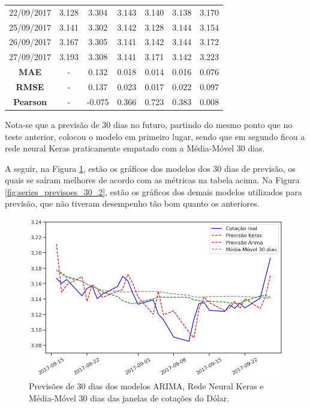 \begin{longtable}{|c|c|c|c|c|c|c|}
22/09/2017 & 3.128 & 3.304 & 3.143 & 3.140 & 3.138 & 3.170 \\
25/09/2017 & 3.141 & 3.302 & 3.142 & 3.128 & 3.144 & 3.154 \\
26/09/2017 & 3.167 & 3.305 & 3.141 & 3.142 & 3.144 & 3.172 \\
27/09/2017 & 3.193 & 3.308 & 3.141 & 3.171 & 3.142 & 3.223 \\
\hline
\hline
\textbf{MAE} & - & 0.132 & 0.018 & 0.014 & 0.016 & 0.076 \\
\textbf{RMSE} & - & 0.137 & 0.023 & 0.017 & 0.022 & 0.097 \\
\textbf{Pearson} & - & -0.075 & 0.366 & 0.723 & 0.383 & 0.008 \\

\end{longtable}
\normalsize

Nota-se que a previsão de $30$ dias no futuro, partindo do mesmo ponto que no teste anterior, colocou o modelo  em primeiro lugar, sendo que em segundo ficou a rede neural Keras praticamente empatado com a Média-Móvel $30$ dias.


A seguir, na Figura \ref{fig:series_previsoes_30_1}, estão os gráficos dos modelos dos $30$ dias de previsão, os quais se saíram melhores de acordo com as métricas na tabela acima. Na Figura \ref{fig:series_previsoes_30_2}, estão os gráficos dos demais modelos utilizados para previsão, que não tiveram desempenho tão bom quanto os anteriores.

\begin{figure}[htb]
\centering
\includegraphics[width=14cm]{figuras/series_previsoes_30_1}
\caption{Previsões de $30$ dias dos modelos ARIMA, Rede Neural Keras e Média-Móvel $30$ dias das janelas de cotações do Dólar.}
\label{fig:series_previsoes_30_1}
\end{figure}

